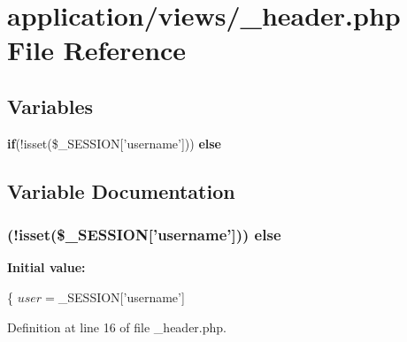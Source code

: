 \section{application/views/\-\_\-header.php File Reference}
\label{__header_8php}
\subsection*{Variables}
\begin{DoxyCompactItemize}
\item 
{\bf if}(!isset(\$\-\_\-\-S\-E\-S\-S\-I\-O\-N['username'])) {\bf else}
\end{DoxyCompactItemize}


\subsection{Variable Documentation}
\subsubsection[{else}]{ (!isset(\$\-\_\-\-S\-E\-S\-S\-I\-O\-N['username'])) else}\label{__header_8php_a8691f3cba8478e398368302e5f0cb89b}
{\bfseries Initial value\-:}
\begin{DoxyCode}
\{ 
                    $user = $\_SESSION[\textcolor{stringliteral}{'username'}]
\end{DoxyCode}


Definition at line 16 of file \-\_\-header.\-php.

